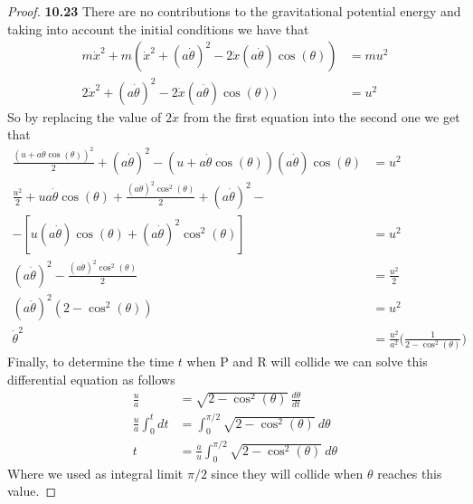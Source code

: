 \documentclass[11pt]{article}
\theoremstyle{definition}
\begin{document}
\begin{proof}{\textbf{10.23}}
    There are no contributions to the gravitational potential energy and
    taking into account the initial conditions we have that
    \begin{align*}
        m\dot x^2 +
        m(\dot x^2 + (a\dot\theta)^2 - 2 \dot x (a\dot\theta) \cos(\theta))
        &= mu^2\\
        2\dot x^2 + (a\dot\theta)^2 - 2 \dot x (a\dot\theta) \cos(\theta))
        &= u^2
    \end{align*}
    So by replacing the value of $2\dot x$ from the first equation into
    the second one we get that
    \begin{align*}
        \frac{(u + a\dot{\theta}\cos(\theta))^2}{2} + (a\dot\theta)^2
        - (u + a\dot{\theta}\cos(\theta))(a\dot\theta) \cos(\theta)
        &= u^2\\
        \frac{u^2}{2} + ua\dot{\theta}\cos(\theta)
        + \frac{(a\dot{\theta})^2\cos^2(\theta)}{2}
        + (a\dot\theta)^2 - \quad&\\
        - [u(a\dot\theta) \cos(\theta) + (a\dot\theta)^2 \cos^2(\theta)]
        &= u^2\\
        (a\dot\theta)^2 - \frac{(a\dot{\theta})^2\cos^2(\theta)}{2}
        &= \frac{u^2}{2}\\
        (a\dot\theta)^2( 2 - \cos^2(\theta))
        &= u^2\\
        \dot{\theta}^2 &= \frac{u^2}{a^2}\bigg(\frac{1}{2 - \cos^2(\theta)}\bigg)
    \end{align*}
    Finally, to determine the time $t$ when P and R will collide we can solve
    this differential equation as follows
    \begin{align*}
        \frac{u}{a} &= \sqrt{2 - \cos^2(\theta)}~\frac{d\theta}{dt}\\
        \frac{u}{a} \int_0^t dt &= \int_0^{\pi/2} \sqrt{2 - \cos^2(\theta)}~d\theta\\
        t &= \frac{a}{u}\int_0^{\pi/2} \sqrt{2 - \cos^2(\theta)}~d\theta
    \end{align*}
    Where we used as integral limit $\pi/2$ since they will collide when
    $\theta$ reaches this value.
    \end{proof}
\cleardoublepage
\end{document}
